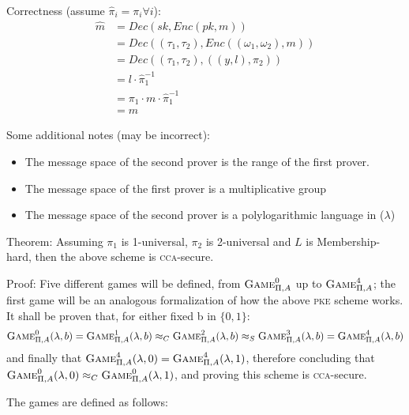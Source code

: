Correctness (assume $\hat{\pi}_i = \pi_i \forall i$):
\begin{align*}
    \hat{m} &= Dec(sk, Enc(pk, m)) \\
    &= Dec((\tau_1, \tau_2), Enc((\omega_1, \omega_2), m)) \\
    &= Dec((\tau_1, \tau_2), ((y, l), \pi_2)) \\
    &= l \cdot \hat{\pi}_1^{-1} \\
    &= \pi_1 \cdot m \cdot \hat{\pi}_1^{-1} \\
    &= m
\end{align*}

Some additional notes (may be incorrect):
\begin{itemize}
    \item The message space of the second prover is the range of the first prover.
    \item The message space of the first prover is a multiplicative group
    \item The message space of the second prover is a polylogarithmic language in ($\lambda$)
\end{itemize}

Theorem: Assuming $\pi_1$ is 1-universal, $\pi_2$ is 2-universal and $L$ is Membership-hard, then the above scheme is \textsc{cca}-secure.

Proof: Five different games will be defined, from $\textsc{Game}_{\Pi, A}^0$ up to $\textsc{Game}_{\Pi, A}^4$; the first game will be an analogous formalization of how the above \textsc{pke} scheme works. It shall be proven that, for either fixed b in $\{0, 1\}$:
\begin{equation*}
    \textsc{Game}_{\Pi, A}^0(\lambda, b) = \textsc{Game}_{\Pi, A}^1(\lambda, b) \approx_C \textsc{Game}_{\Pi, A}^2(\lambda, b) \approx_S \textsc{Game}_{\Pi, A}^3(\lambda, b) = \textsc{Game}_{\Pi, A}^4(\lambda, b)
\end{equation*}
and finally that $\textsc{Game}_{\Pi, A}^4(\lambda, 0) = \textsc{Game}_{\Pi, A}^4(\lambda, 1)$, therefore concluding that $\textsc{Game}_{\Pi, A}^0(\lambda, 0) \approx_C \textsc{Game}_{\Pi, A}^0(\lambda, 1)$, and proving this scheme is \textsc{cca}-secure.


The games are defined as follows:

